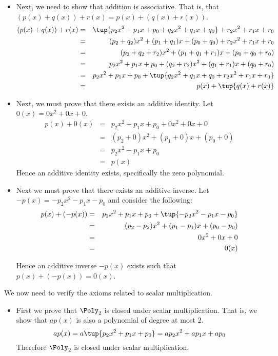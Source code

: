 \begin{solution}
\begin{itemize}
\item
Next, we need to show that addition is associative. That is, that $(p(x) + q(x)) + r(x) = p(x) + (q(x)+r(x))$. 
\begin{eqnarray*}
(p(x) + q(x)) + r(x) &=& \tup{p_2x^2 +p_1x + p_0 + q_2x^2 + q_1x + q_0 } + r_2x^2 +r_1x + r_0 \\
&=&  (p_2+q_2)x^2 + (p_1+q_1)x + (p_0 +q_0) + r_2x^2 + r_1x + r_0\\
&=&  (p_2+q_2+r_2)x^2 + (p_1+q_1+r_1)x + (p_0+q_0+r_0)  \\
&=&  p_2x^2 + p_1x + p_0 +  (q_2+r_2)x^2 + (q_1+r_1)x + (q_0+r_0)  \\
&=&  p_2x^2 + p_1x + p_0 + \tup{q_2x^2 +q_1x + q_0 + r_2x^2 + r_1x + r_0 }\\
&=& p(x) + \tup{q(x) + r(x) }
\end{eqnarray*}

\item
Next, we must prove that there exists an additive identity. Let $0(x)=0x^2+0x+0$. 
\begin{eqnarray*}
p(x) + 0(x)  &=&  p_2x^2 + p_1x + p_0 + 0x^2 + 0x + 0 \\
&=&  (p_2 + 0)x^2  + (p_1 + 0)x + (p_0 + 0)\\
&=&  p_2x^2 + p_1x + p_0 \\
&=& p(x)
\end{eqnarray*}
Hence an additive identity exists, specifically the zero polynomial. 

\item 
Next we must prove that there exists an additive inverse. Let $-p(x) = -p_2x^2 - p_1x - p_0$ and consider the following:
\begin{eqnarray*}
p(x) + (-p(x)) &=&   p_2x^2 + p_1x + p_0 + \tup{- p_2x^2  - p_1x - p_0} \\
&=& (p_2 - p_2)x^2  + (p_1 - p_1)x + (p_0 - p_0) \\
&=& 0x^2 + 0x + 0 \\
&=& 0(x)
\end{eqnarray*}

Hence an additive inverse $-p(x)$ exists such that $p(x) + (-p(x)) = 0(x)$. 
\end{itemize} 

We now need to verify the axioms related to scalar multiplication. 
\begin{itemize}
\item
First we prove that $\Poly_2$ is closed under scalar multiplication. That is, we show that $ap(x)$ is also a polynomial of degree at most $2$. 
\[
ap(x) = a\tup{p_2x^2 + p_1x + p_0 } = ap_2x^2 +ap_1x+ ap_0
\]
Therefore $\Poly_2$ is closed under scalar multiplication. 


\end{itemize}
\end{solution}
